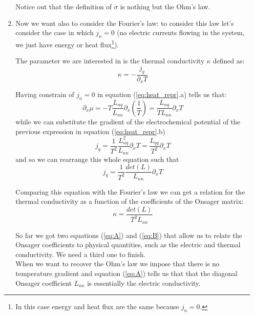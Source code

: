 \documentclass[\main/main.tex]{subfiles}
\begin{document}
\begin{enumerate}
    Notice out that the definition of $\sigma$ is nothing but the Ohm's law.
    
    \item Now we want also to consider the Fourier's law: to consider this law let's consider the case in which $j_n=0$ (no electric currents flowing in the system, we just have energy or heat flux\footnote{In this case energy and heat flux are the same because $j_n=0$.}).
    
    The parameter we are interested in is the thermal conductivity $\kappa$ defined as:
    \begin{equation}
        \kappa=-\frac{j_q}{\partial_xT}
    \end{equation}
    
    Having constrain of $j_n=0$ in equation (\ref{eq:heat_repr}.a) tells us that:
    \begin{equation}
        \partial_x\mu=-T\frac{L_{nq}}{L_{nn}}\partial_x\left(\frac{1}{T}\right)=\frac{L_{nq}}{T L_{nn}}\partial_x T
        \label{eq:ref}
    \end{equation}
    while we can substitute the gradient of the electrochemical potential of the previous expression in equation (\ref{eq:heat_repr}.b)
    \begin{equation}
           j_q=\frac{1}{T^2}\frac{L^2_{nq}}{L_{nn}}\partial_x T=\frac{L_{qq}}{T^2}\partial_xT
    \end{equation} 
    and so we can rearrange this whole equation such that
    \begin{equation}
        j_q=\frac{1}{T^2}\frac{det(L)}{L_{nn}}\partial_xT
    \end{equation}
    
    Comparing this equation with the Fourier's law we can get a relation for the thermal conductivity as a function of the coefficients of the Onsager matrix:
    \begin{equation}
        \boxed{\kappa=\frac{det(L)}{T^2L_{nn}}}
        \label{eq:B}
    \end{equation}
 
    So far we got two equations (\ref{eq:A}) and (\ref{eq:B}) that allow us to relate the Onsager coefficients to physical quantities, such as the electric and thermal conductivity. We need a third one to finish. \\
    
    When we want to recover the Ohm's law we impose that there is no temperature gradient and equation (\ref{eq:A}) tells us that that the diagonal Onsager coefficient $L_{nn}$ is essentially the electric conductivity.
    

\end{enumerate}
\end{document}
